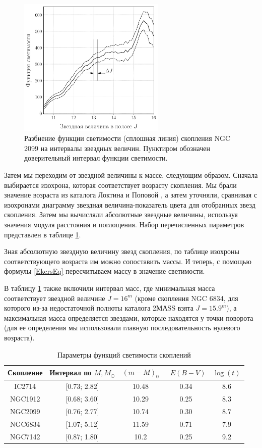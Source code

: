 \documentclass[a4paper,12pt]{article}
\begin{document}
\begin{figure}\centering
\includegraphics[width=7cm]{images/LF}
	\caption{Разбиение функции светимости (сплошная линия) скопления NGC 2099 на интервалы звездных величин. Пунктиром обозначен доверительный интервал функции светимости.}
	\label{LF}
\end{figure}

Затем мы переходим от звездной величины к массе, следующим образом. Сначала выбирается изохрона, которая соответствует возрасту скопления. Мы брали значение возраста из каталога Локтина и Поповой \cite{LoPo}, а затем уточняли, сравнивая с изохронами \cite{Bressan} диаграмму звездная величина-показатель цвета для отобранных звезд  скопления. Затем мы вычисляли абсолютные звездные величины, используя значения модуля расстояния и поглощения. Набор перечисленных параметров представлен в таблице \ref{clusters}. 

Зная абсолютную звездную величину звезд скопления, по таблице изохроны соответствующего возраста им можно сопоставить массы.  И теперь, с помощью формулы \ref{EkersEq} пересчитываем массу в значение светимости.

В таблицу \ref{clusters} также включили интервал масс, где минимальная масса соответствует звездной величине $J = 16^m$ (кроме скопления NGC 6834, для которого из-за недостаточной полноты каталога 2МАSS взята $J = 15.9^m$), а максимальная масса определяется звездами, которые находятся у точки поворота (для ее определения мы использовали главную последовательность нулевого возраста).


\begin{table}[h!]
\caption{Параметры функций светимости скоплений}
\vspace{0.5cm}
\centering
		\begin{tabular}{|c|c|c|c|c|}
			\hline
				{Скопление} & {Интервал по $M, M_{\odot}$}& ${(m-M)_0}$ & \ ${E(B-V)}$ & ${\log(t)}$\\
			\hline
			IC2714 & [0.73; 2.82] & 10.48 & 0.34 & 8.6\\
			NGC1912 & [0.68;  3.60] & 10.29 & 0.25 & 8.3\\
			NGC2099 & [0.76;  2.77] & 10.74 & 0.30 & 8.7\\
			NGC6834 & [1.07;  5.12] & 11.59 & 0.71 & 7.9\\
			NGC7142 & [0.87;  1.80] & 10.2 & 0.25 & 9.2\\
			\hline
		\end{tabular}
\label{clusters}
\end{table}
\end{document}
